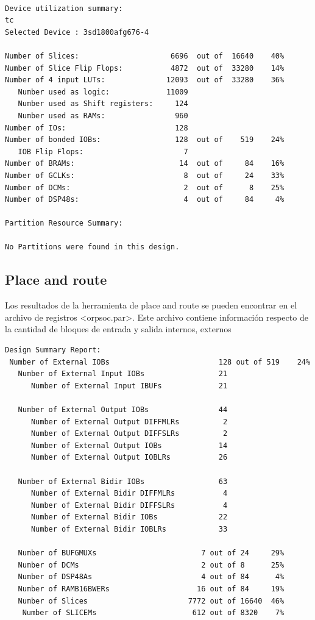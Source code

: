 \begin{lstlisting}[frame=single,caption={Resumen de utilización - OResultado de PARRPSoC},label={lst:salidas},breaklines]

Device utilization summary:
tc
Selected Device : 3sd1800afg676-4 

Number of Slices:                     6696  out of  16640    40%  
Number of Slice Flip Flops:           4872  out of  33280    14%  
Number of 4 input LUTs:              12093  out of  33280    36%  
   Number used as logic:             11009
   Number used as Shift registers:     124
   Number used as RAMs:                960
Number of IOs:                         128
Number of bonded IOBs:                 128  out of    519    24%  
   IOB Flip Flops:                       7
Number of BRAMs:                        14  out of     84    16%  
Number of GCLKs:                         8  out of     24    33%  
Number of DCMs:                          2  out of      8    25%  
Number of DSP48s:                        4  out of     84     4%  

Partition Resource Summary:

No Partitions were found in this design.
\end{lstlisting}	
		
		\subsection{Place and route}	
		
		Los resultados de la herramienta de place and route se pueden encontrar en el archivo de registros <orpsoc.par>. Este archivo contiene información
		respecto de la cantidad de bloques de entrada y salida internos, externos 
		
\begin{lstlisting}[frame=single,caption={Resultado de PAR},label={lst:salidas},breaklines]
Design Summary Report:
 Number of External IOBs                         128 out of 519    24%
   Number of External Input IOBs                 21
      Number of External Input IBUFs             21

   Number of External Output IOBs                44
      Number of External Output DIFFMLRs          2
      Number of External Output DIFFSLRs          2
      Number of External Output IOBs             14
      Number of External Output IOBLRs           26

   Number of External Bidir IOBs                 63
      Number of External Bidir DIFFMLRs           4
      Number of External Bidir DIFFSLRs           4
      Number of External Bidir IOBs              22
      Number of External Bidir IOBLRs            33

   Number of BUFGMUXs                        7 out of 24     29%
   Number of DCMs                            2 out of 8      25%
   Number of DSP48As                         4 out of 84      4%
   Number of RAMB16BWERs                    16 out of 84     19%
   Number of Slices                       7772 out of 16640  46%
    Number of SLICEMs                      612 out of 8320    7%
\end{lstlisting}

